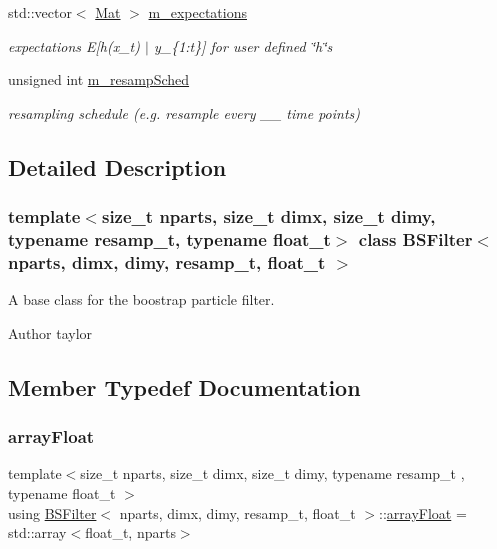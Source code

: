\begin{DoxyCompactItemize}
\mbox{\label{classBSFilter_afc613fc34025a80b7745ae1e191c78c0}} 
std\+::vector$<$ \hyperlink{classBSFilter_a8ec8e8477e12686e706e7d7aa5c2971c}{Mat} $>$ \hyperlink{classBSFilter_afc613fc34025a80b7745ae1e191c78c0}{m\+\_\+expectations}
\begin{DoxyCompactList}\small\item\em expectations E\mbox{[}h(x\+\_\+t) $\vert$ y\+\_\+\{1\+:t\}\mbox{]} for user defined \char`\"{}h\char`\"{}s \end{DoxyCompactList}\item 
\mbox{\label{classBSFilter_a3ae16f95c62e798c64150d3bb1451c9c}} 
unsigned int \hyperlink{classBSFilter_a3ae16f95c62e798c64150d3bb1451c9c}{m\+\_\+resamp\+Sched}
\begin{DoxyCompactList}\small\item\em resampling schedule (e.\+g. resample every \+\_\+\+\_\+ time points) \end{DoxyCompactList}\end{DoxyCompactItemize}


\subsection{Detailed Description}
\subsubsection*{template$<$size\+\_\+t nparts, size\+\_\+t dimx, size\+\_\+t dimy, typename resamp\+\_\+t, typename float\+\_\+t$>$\newline
class B\+S\+Filter$<$ nparts, dimx, dimy, resamp\+\_\+t, float\+\_\+t $>$}

A base class for the boostrap particle filter. 

\begin{DoxyAuthor}{Author}
taylor 
\end{DoxyAuthor}


\subsection{Member Typedef Documentation}
\mbox{\label{classBSFilter_a14a572439ddfe7d2b4157d4c91617981}} 
\subsubsection{\texorpdfstring{array\+Float}{arrayFloat}}
{\footnotesize\ttfamily template$<$size\+\_\+t nparts, size\+\_\+t dimx, size\+\_\+t dimy, typename resamp\+\_\+t , typename float\+\_\+t $>$ \\
using \hyperlink{classBSFilter}{B\+S\+Filter}$<$ nparts, dimx, dimy, resamp\+\_\+t, float\+\_\+t $>$\+::\hyperlink{classBSFilter_a14a572439ddfe7d2b4157d4c91617981}{array\+Float} =  std\+::array$<$float\+\_\+t, nparts$>$}

